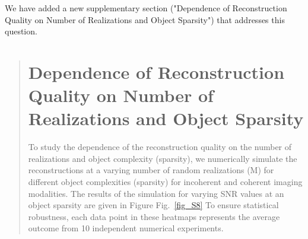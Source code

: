 \documentclass[12pt]{article}
\newcommand{\hlred}[1]{\sethlcolor{red!30}\hl{#1}}
\newenvironment{ourresponse}
    {\begin{tcolorbox}[width=\linewidth,breakable,enhanced,colback=gray!5,colframe=responsecolor!50,title=Response,left=5pt,right=5pt]}
    {\end{tcolorbox}}
\begin{document}
\begin{enumerate}[label=\arabic*.]
\begin{ourresponse}
    We have added a new supplementary section ("Dependence of Reconstruction Quality on Number of Realizations and Object Sparsity") that addresses this question.
    
    
    \begin{quote}
        \section*{Dependence of Reconstruction Quality on Number of Realizations and Object Sparsity}


        
        To study the dependence of the reconstruction quality on the number of realizations and object complexity (sparsity), we numerically simulate the reconstructions at a varying number of random realizations (M) for different object complexities (sparsity) for incoherent and coherent imaging modalities.
        The results of the simulation for varying SNR values at an object sparsity are given in Figure Fig.~\ref{fig_S8}
        To ensure statistical robustness, each data point in these heatmaps represents the average outcome from 10 independent numerical experiments.


\end{quote}
\end{ourresponse}
\end{enumerate}
\end{document}
